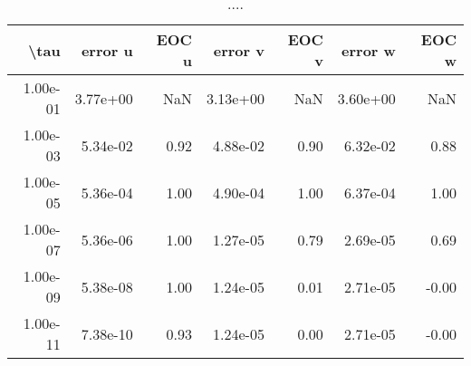 \begin{table}[ht]
\centering
\begin{tabular}{rrrrrrr}
  \hline
  \textbf{\textbackslash{}tau} & \textbf{error u} & \textbf{EOC u} & \textbf{error v} & \textbf{EOC v} & \textbf{error w} & \textbf{EOC w} \\\hline
  1.00e-01 & 3.77e+00 & NaN & 3.13e+00 & NaN & 3.60e+00 & NaN \\
  1.00e-03 & 5.34e-02 & 0.92 & 4.88e-02 & 0.90 & 6.32e-02 & 0.88 \\
  1.00e-05 & 5.36e-04 & 1.00 & 4.90e-04 & 1.00 & 6.37e-04 & 1.00 \\
  1.00e-07 & 5.36e-06 & 1.00 & 1.27e-05 & 0.79 & 2.69e-05 & 0.69 \\
  1.00e-09 & 5.38e-08 & 1.00 & 1.24e-05 & 0.01 & 2.71e-05 & -0.00 \\
  1.00e-11 & 7.38e-10 & 0.93 & 1.24e-05 & 0.00 & 2.71e-05 & -0.00 \\\hline
\end{tabular}
\caption{....}
\end{table}
